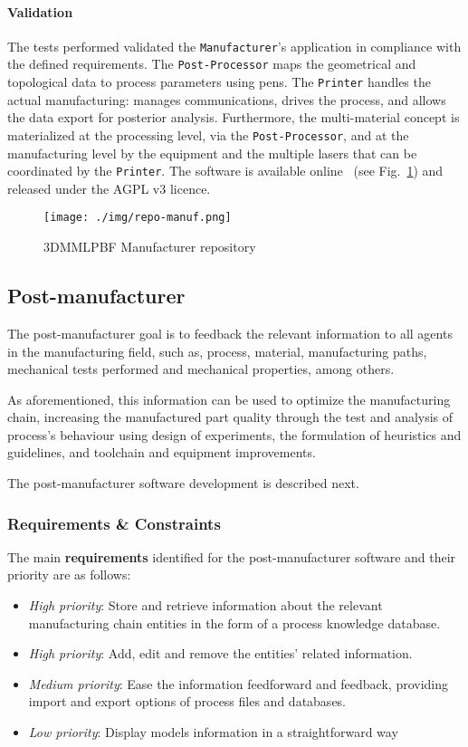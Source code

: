 \paragraph{Validation}
The tests performed validated the \texttt{Manufacturer}'s application in
compliance with the defined requirements. The \texttt{Post-Processor} maps the
geometrical and topological data to process parameters using pens. The
\texttt{Printer} handles the actual manufacturing: manages communications,
drives the process, and allows the data export for posterior
analysis. Furthermore, the multi-material concept is materialized at the
processing level, via the \texttt{Post-Processor}, and at the manufacturing
level by the equipment and the multiple lasers that can be coordinated by the
\texttt{Printer}.
%
The software is available online~\cite{repoManuf} (see Fig.~\ref{fig:repoManuf}) and released
under the AGPL v3 licence.

\begin{figure}[!hbt]
  \centering
    \texttt{[image: ./img/repo-manuf.png]}
    \caption{3DMMLPBF Manufacturer repository~\cite{repoManuf}}%
    \label{fig:repoManuf}
\end{figure}


\subsection{Post-manufacturer}%
\label{sec:post-manufacturer}
The post-manufacturer goal is to feedback the relevant information to all agents
in the manufacturing field, such as, process, material, manufacturing paths,
mechanical tests performed and mechanical properties, among others.

As aforementioned, this information can be used to optimize the manufacturing
chain, increasing the manufactured part quality through the test and analysis of process's
behaviour using design of experiments, the formulation of heuristics and
guidelines, and toolchain and equipment improvements.

The post-manufacturer software development is described next.
% 
\subsubsection{Requirements \& Constraints}%
\label{sec:post-manuf-require-elic}
The main \textbf{requirements} identified for the post-manufacturer software and their
priority are as follows:
\begin{itemize}
\item \emph{High priority}: Store and retrieve information about the relevant manufacturing chain
  entities in the form of a process knowledge database.
\item \emph{High priority}: Add, edit and remove the entities' related information.
\item \emph{Medium priority}: Ease the information feedforward and feedback, providing import and export
  options of process files and databases.
\item \emph{Low priority}: Display models information in a straightforward way
\end{itemize}

